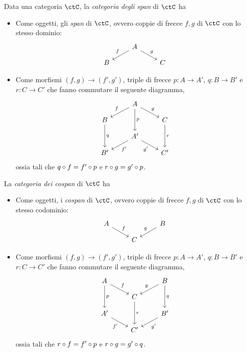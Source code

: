 \begin{definition}\label{def_span_e_cospan}
	Data una categoria \(\ctC\), la \emph{categoria degli span} di \(\ctC\) ha
	\begin{itemize}
		\item Come oggetti, gli \emph{span} di \(\ctC\), ovvero coppie di frecce \(f,g\) di \(\ctC\) con lo stesso dominio:
		      \[
			      \begin{tikzcd}[row sep=small]
				      & A \ar{dl}[swap]{f} \ar{dr}{g} \\
				      B && C
			      \end{tikzcd}
		      \]
		\item Come morfismi \((f,g)\to (f',g')\), triple di frecce \(p:A\to A'\), \(q:B\to B'\) e \(r:C\to C'\) che fanno commutare il seguente diagramma,
		      \[
			      \begin{tikzcd}[row sep=small]
				      & A \ar{dd}{p} \ar{dl}[swap]{f} \ar{dr}{g} \\
				      B \ar{dd}{q} && C \ar{dd}{r} \\
				      & A' \ar{dl}{f'} \ar{dr}[swap]{g'} \\
				      B' && C'
			      \end{tikzcd}
		      \]
		      ossia tali che \(q\circ f=f'\circ p\) e \(r\circ g=g'\circ p\).
	\end{itemize}

	La \emph{categoria dei cospan} di \(\ctC\) ha
	\begin{itemize}
		\item Come oggetti, i \emph{cospan} di \(\ctC\), ovvero coppie di frecce \(f,g\) di \(\ctC\) con lo stesso codominio:
		      \[
			      \begin{tikzcd}[row sep=small]
				      A \ar{dr}{f} && B \ar{dl}[swap]{g} \\
				      & C
			      \end{tikzcd}
		      \]
		\item Come morfismi \((f,g)\to (f',g')\), triple di frecce \(p:A\to A'\), \(q:B\to B'\) e \(r:C\to C'\) che fanno commutare il seguente diagramma,
		      \[
			      \begin{tikzcd}[row sep=small]
				      A \ar{dd}{p} \ar{dr}{f} && B \ar{dd}{q} \ar{dl}[swap]{g} \\
				      & C \ar{dd}{r} \\
				      A' \ar{dr}[swap]{f'} && B' \ar{dl}{g'} \\
				      & C'
			      \end{tikzcd}
		      \]
		      ossia tali che \(r\circ f=f'\circ p\) e \(r\circ g=g'\circ q\).
	\end{itemize}
\end{definition}
